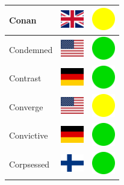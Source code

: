 \documentclass[12pt, a4paper, twoside]{report}
\begin{document}
\begin{center}
\begin{longtable}{|p{5cm}|p{2cm}|p{2cm}|}
 Conan                                                      & \includegraphics[width=1cm]{../4x3/gb} &   \includegraphics[width=1cm]{../likes/m} \\ \hline
 Condemned                                                  & \includegraphics[width=1cm]{../4x3/us} &   \includegraphics[width=1cm]{../likes/y} \\ \hline
 Contrast                                                   & \includegraphics[width=1cm]{../4x3/de} &   \includegraphics[width=1cm]{../likes/y} \\ \hline
 Converge                                                   & \includegraphics[width=1cm]{../4x3/us} &   \includegraphics[width=1cm]{../likes/m} \\ \hline
 Convictive                                                 & \includegraphics[width=1cm]{../4x3/de} &   \includegraphics[width=1cm]{../likes/y} \\ \hline
 Corpsessed                                                 & \includegraphics[width=1cm]{../4x3/fi} &   \includegraphics[width=1cm]{../likes/y} \\ \hline

\end{longtable}
\end{center}
\end{document}
